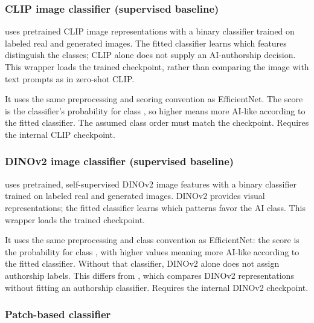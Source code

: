 \subsubsection{CLIP image classifier (supervised
baseline)}\label{record-DETECTORS-md-clip-image-classifier-supervised-baseline}

\texttt{} uses pretrained CLIP image
representations with a binary classifier trained on labeled real and
generated images. The fitted classifier learns which features
distinguish the classes; CLIP alone does not supply an AI-authorship
decision. This wrapper loads the trained checkpoint, rather than
comparing the image with text prompts as in zero-shot CLIP.

It uses the same preprocessing and scoring convention as EfficientNet.
The score is the classifier's probability for class
\texttt{}, so higher means more AI-like according to
the fitted classifier. The assumed class order must match the
checkpoint. Requires the internal
\texttt{} CLIP checkpoint.

\subsubsection{DINOv2 image classifier (supervised
baseline)}\label{record-DETECTORS-md-dinov2-image-classifier-supervised-baseline}

\texttt{} uses pretrained, self-supervised
DINOv2 image features with a binary classifier trained on labeled real
and generated images. DINOv2 provides visual representations; the fitted
classifier learns which patterns favor the AI class. This wrapper loads
the trained checkpoint.

It uses the same preprocessing and class convention as EfficientNet: the
score is the probability for class \texttt{}, with
higher values meaning more AI-like according to the fitted classifier.
Without that classifier, DINOv2 alone does not assign authorship labels.
This differs from \texttt{}, which compares
DINOv2 representations without fitting an authorship classifier.
Requires the internal \texttt{} DINOv2
checkpoint.

\subsubsection{Patch-based
classifier}\label{record-DETECTORS-md-patch-based-classifier}

